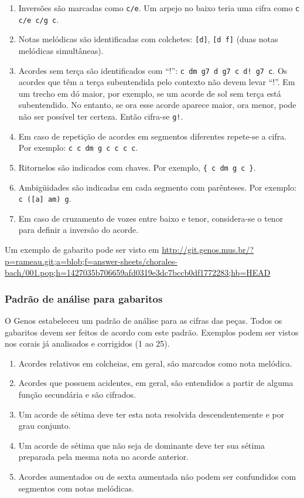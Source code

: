 \documentclass[12pt,brazil]{book}
\begin{document}
\begin{enumerate}
  \item Inversões são marcadas como \texttt{c/e}. Um arpejo no baixo
    teria uma cifra como \texttt{c c/e c/g c}.
\item Notas melódicas são identificadas com colchetes: \texttt{[d]},
  \texttt{[d f]} (duas notas melódicas simultâneas).
\item Acordes sem terça são identificados com ``!'': \texttt{c dm g7
    d g7 c d!  g7 c}. Os acordes que têm a terça subentendida pelo
  contexto não devem levar ``!''. Em um trecho em dó maior, por
  exemplo, se um acorde de sol sem terça está subentendido. No
  entanto, se ora esse acorde aparece maior, ora menor, pode não ser
  possível ter certeza. Então cifra-se \texttt{g!}.
\item Em caso de repetição de acordes em segmentos diferentes
  repete-se a cifra. Por exemplo: \texttt{c c dm g c c c c}.
\item Ritornelos são indicados com chaves. Por exemplo, \texttt{\{ c
    dm g c \}}.
\item Ambigüidades são indicadas em cada segmento com parênteses. Por
  exemplo: \texttt{c ([a] am) g}.
\item Em caso de cruzamento de vozes entre baixo e tenor, considera-se
  o tenor para definir a inversão do acorde.
\end{enumerate}

Um exemplo de gabarito pode ser visto em
\url{http://git.genos.mus.br/?p=rameau.git;a=blob;f=answer-sheets/chorales-bach/001.pop;h=1427035b706659afd0319e3dc7bccb0df1772283;hb=HEAD}

\subsubsection{Padrão de análise para gabaritos}
\label{sec:padrao-de-analise}

O Genos estabeleceu um padrão de análise para as cifras das
peças. Todos os gabaritos devem ser feitos de acordo com este
padrão. Exemplos podem ser vistos nos corais já analisados e
corrigidos (1 ao 25).

\begin{enumerate}
\item Acordes relativos em colcheias, em geral, são marcados como nota
  melódica.
\item Acordes que possuem acidentes, em geral, são entendidos a partir
  de alguma função secundária e são cifrados.
\item Um acorde de sétima deve ter esta nota resolvida
  descendentemente e por grau conjunto.
\item Um acorde de sétima que não seja de dominante deve ter sua
  sétima preparada pela mesma nota no acorde anterior.
\item Acordes aumentados ou de sexta aumentada não podem ser
  confundidos com segmentos com notas melódicas.
\end{enumerate}
\end{document}
